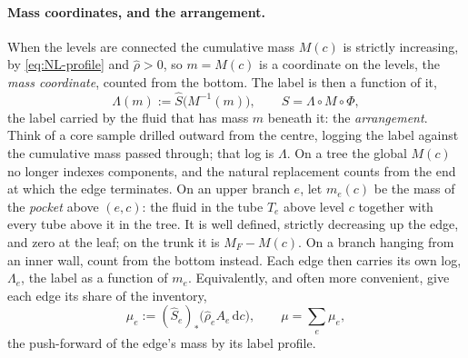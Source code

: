 \documentclass[11pt]{article}
\theoremstyle{definition}
\theoremstyle{remark}
\newcommand{\dc}{\,\mathrm{d}c}
\begin{document}
\paragraph{Mass coordinates, and the arrangement.} When the levels are
connected the cumulative mass $M(c)$ is strictly increasing, by
\eqref{eq:NL-profile} and $\hat\rho > 0$, so $m = M(c)$ is a coordinate
on the levels, the \emph{mass coordinate}, counted from the bottom.
The label is then a function of it,
\begin{equation}
  \Lambda(m) := \hat S\bigl(M^{-1}(m)\bigr),\qquad
  S = \Lambda\circ M\circ\Phi ,
  \label{eq:Lambda}
\end{equation}
the label carried by the fluid that has mass $m$ beneath it: the
\emph{arrangement}. Think of a core sample drilled outward from the
centre, logging the label against the cumulative mass passed through;
that log is $\Lambda$. On a tree the global $M(c)$ no longer indexes
components, and the natural replacement counts from the end at which
the edge terminates. On an upper branch $e$, let $m_e(c)$ be the mass
of the \emph{pocket} above $(e, c)$: the fluid in the tube $T_e$ above
level $c$ together with every tube above it in the tree. It is well
defined, strictly decreasing up the edge, and zero at the leaf; on the
trunk it is $M_F - M(c)$. On a branch hanging from an inner wall,
count from the bottom instead. Each edge then carries its own log,
$\Lambda_e$, the label as a function of $m_e$. Equivalently, and often
more convenient, give each edge its share of the inventory,
\begin{equation}
  \mu_e := (\hat S_e)_*\bigl(\hat\rho_eA_e\dc\bigr),\qquad
  \mu = \sum_e\mu_e ,
  \label{eq:mue}
\end{equation}
the push-forward of the edge's mass by its label profile.
\end{document}
